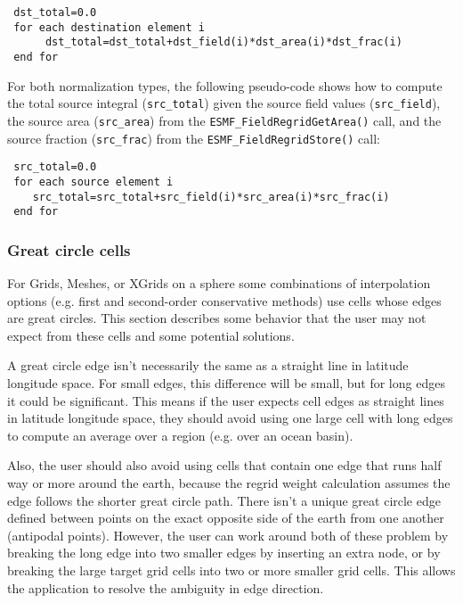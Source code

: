\begin{verbatim}
 dst_total=0.0
 for each destination element i
      dst_total=dst_total+dst_field(i)*dst_area(i)*dst_frac(i) 
 end for
\end{verbatim}

 For both normalization types, the following pseudo-code shows how to compute the total source integral ({\tt src\_total}) given the source field values
 ({\tt src\_field}), the source area ({\tt src\_area}) from the {\tt ESMF\_FieldRegridGetArea()} call, and
 the source fraction ({\tt src\_frac}) from the {\tt ESMF\_FieldRegridStore()} call:

\begin{verbatim}
 src_total=0.0
 for each source element i
    src_total=src_total+src_field(i)*src_area(i)*src_frac(i)
 end for
\end{verbatim}

\subsubsection{Great circle cells}\label{sec:interpolation:great_circle_cells}
 For Grids, Meshes, or XGrids on a sphere some combinations of interpolation options 
 (e.g. first and second-order conservative methods) use cells whose edges are great circles. This section describes some behavior 
 that the user may not expect from these cells and some potential solutions. 
 
 A great circle edge isn't necessarily the same as a straight line in latitude longitude space. 
 For small edges, this difference will be small, but for long edges it
 could be significant. This means if the user expects cell edges as straight lines in latitude longitude 
 space, they should avoid using one large cell with 
 long edges to compute an average over a region (e.g. over an ocean basin).

 Also, the  user should also avoid using cells that contain one edge that runs half way or more around the earth, because the 
 regrid weight calculation assumes the edge follows the shorter great circle path. 
 There isn't a unique great circle edge defined between points on the 
 exact opposite side of the earth from one another (antipodal points). 
 However, the user can work around both of these problem by breaking the long edge into two smaller edges by inserting 
 an extra node, or by breaking the large target grid cells 
 into two or more smaller grid cells. This allows the application to resolve the ambiguity in edge direction. 

